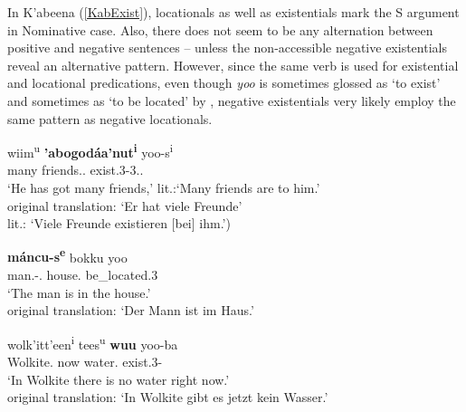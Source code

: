 

In K'abeena (\ref{KabExist}), locationals as well as existentials  mark the S argument in Nominative case.
Also, there does not seem to be any alternation between positive and negative sentences -- unless the non-accessible negative existentials reveal an alternative pattern. 
However, since the same verb is used for existential and locational predications, even though \emph{yoo} is sometimes glossed as `to exist' and sometimes as `to be located' by \citet{Crass:2005}, negative existentials very likely employ the same pattern as negative locationals. 
 
\pagebreak
\begin{exe}\ex\label{KabExist}
\begin{xlist}
\ex\gll wiim\textsuperscript{u} \textbf{'abogod\'aa'nut\textsuperscript{i}} yoo-s\textsuperscript{i}\\
many friends.\nom{}.\pl{} exist.3-3\sg{}.\mas{}.\obj{}\\
\glt `He has got many friends,' lit.:`Many friends are to him.'\\ 
original translation: `Er hat viele Freunde'\\
lit.: `Viele Freunde exis\-tie\-ren [bei] ihm.')

\ex\gll \textbf{m\'ancu-s\textsuperscript{e}} bokku yoo\\
man.\nom{}-.\mas{} house.\acc{} be\_located.3\\
\glt `The man is in the house.' \\
original translation: `Der Mann ist im Haus.'

\ex\gll wolk'itt'een\textsuperscript{i} tees\textsuperscript{u} \textbf{wuu} yoo-ba\\
Wolkite.\loc{} now water.\nom{} exist.3-\Neg{}\\
\glt `In Wolkite there is no water right now.'\\ 
original translation: `In Wolkite gibt es jetzt kein Wasser.'
\end{xlist}
\end{exe}

